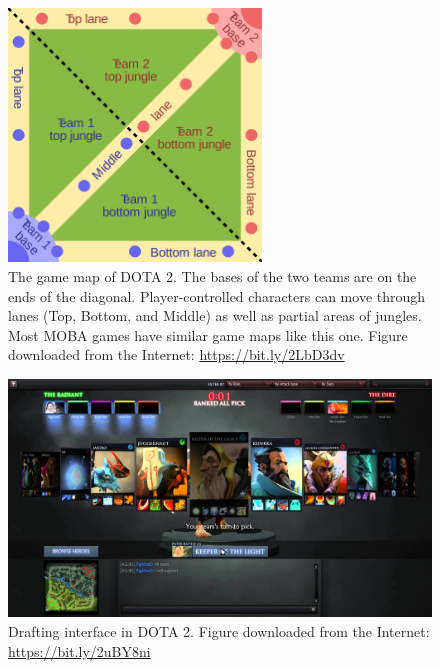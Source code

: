 \begin{figure}
\centering
\includegraphics[width=0.6\textwidth]{Figures/map_of_dota.png}
\caption{The game map of DOTA 2. The bases of the two teams are on the ends of the diagonal. Player-controlled characters can move through lanes (Top, Bottom, and Middle) as well as partial areas of jungles. Most MOBA games have similar game maps like this one. Figure downloaded from the Internet: \url{https://bit.ly/2LbD3dv}}
\label{fig:moba_map}
\end{figure}

\begin{figure}
\centering
\includegraphics[width=1\textwidth]{Figures/ranked_all_pick.jpg}
\caption{Drafting interface in DOTA 2. Figure downloaded from the Internet: \url{https://bit.ly/2uBY8ni}}
\label{fig:ranked_all_pick_interface}
\end{figure}

